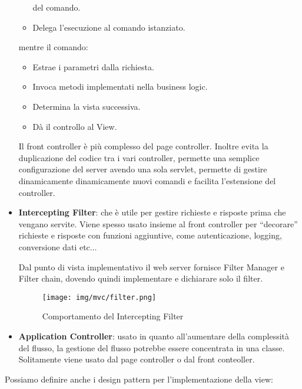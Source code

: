 \begin{itemize}
\begin{itemize}
                    del comando.
              \item Delega l'esecuzione al comando istanziato.
          \end{itemize}
          mentre il comando:
          \begin{itemize}
              \item Estrae i parametri dalla richiesta.
              \item Invoca metodi implementati nella business logic.
              \item Determina la vista successiva.
              \item Dà il controllo al View.
          \end{itemize}
          Il front controller è più complesso del page controller. Inoltre evita
          la duplicazione del codice tra i vari controller, permette una semplice
          configurazione del server avendo una sola servlet, permette di gestire
          dinamicamente dinamicamente nuovi comandi e facilita l'estensione del controller.
    \item \textbf{Intercepting Filter}: che è utile per gestire richieste e risposte
          prima che vengano servite. Viene spesso usato insieme al front controller per
          “decorare” richieste e risposte con funzioni aggiuntive, come autenticazione,
          logging, conversione dati etc$\dots$

          Dal punto di vista implementativo il web server fornisce Filter Manager
          e Filter chain, dovendo quindi implementare e dichiarare solo il filter.
          \begin{figure}[!ht]
              \centering
              \texttt{[image: img/mvc/filter.png]}
              \caption{Comportamento del Intercepting Filter}
          \end{figure}
    \item \textbf{Application Controller}: usato in quanto all'aumentare della
          complessità del flusso, la gestione del flusso potrebbe essere concentrata in
          una classe. Solitamente viene usato dal page controller o dal front conteoller.
\end{itemize}
Possiamo definire anche i design pattern per l'implementazione della view:
